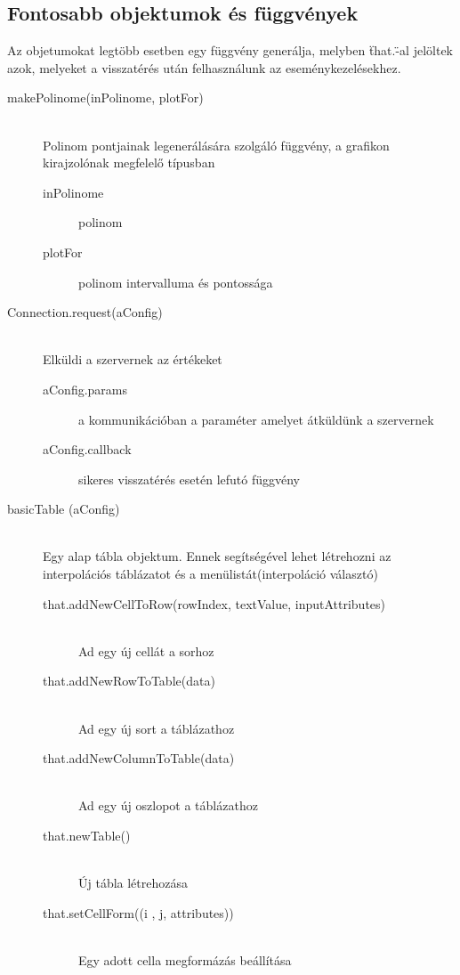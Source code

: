 \subsection{Fontosabb objektumok és függvények}
	\hfill
	Az objetumokat legtöbb esetben egy függvény generálja, melyben \"that.\"-al jelöltek azok, melyeket a visszatérés után felhasználunk az eseménykezelésekhez.
	\begin{description}
		\item[makePolinome(inPolinome, plotFor)] \hfill \\ 
			Polinom pontjainak legenerálására szolgáló függvény, a grafikon kirajzolónak megfelelő típusban
			\begin{description}
				\item[inPolinome] polinom
				\item[plotFor] polinom intervalluma és pontossága
			\end{description}
		\item[Connection.request(aConfig)] \hfill \\ 
			Elküldi a szervernek az értékeket
			\begin{description}
				\item[aConfig.params] a kommunikációban a paraméter amelyet átküldünk a szervernek
				\item[aConfig.callback] sikeres visszatérés esetén lefutó függvény
			\end{description}
		\item[basicTable (aConfig)]
			\hfill \\ 
			Egy alap tábla objektum. Ennek segítségével lehet létrehozni az interpolációs táblázatot és a menülistát(interpoláció választó)
			\begin{description}
			\item[that.addNewCellToRow(rowIndex, textValue, inputAttributes)] 
				\hfill \\  Ad egy új cellát a sorhoz
			\item[that.addNewRowToTable(data)]
				\hfill \\ Ad egy új sort a táblázathoz
			\item[that.addNewColumnToTable(data)]
				\hfill \\ Ad egy új oszlopot a táblázathoz
			\item[that.newTable()] 
				\hfill \\ Új tábla létrehozása
			\item[that.setCellForm((i , j, attributes))] 
				\hfill \\ Egy adott cella megformázás beállítása

\end{description}
\end{description}

